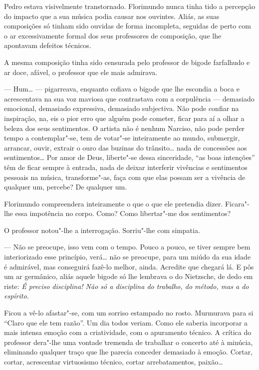 Pedro estava visivelmente transtornado. Florimundo nunca tinha tido a
percepção do impacto que a sua música podia causar nos ouvintes. Aliás,
as suas composições só tinham sido ouvidas de forma incompleta, seguidas
de perto com o ar excessivamente formal dos seus professores de
composição, que lhe apontavam defeitos técnicos.

A mesma composição tinha sido censurada pelo professor de bigode
farfalhudo e ar doce, afável, o professor que ele mais admirava.

--- Hum\ldots{} --- pigarreava, enquanto cofiava o bigode que lhe escondia a boca
e acrescentava na sua voz maviosa que contrastava com a corpulência ---
demasiado emocional, demasiado expressiva, demasiado subjectiva. Não
pode confiar na inspiração, na, eis o pior erro que alguém pode cometer,
ficar para aí a olhar a beleza dos seus sentimentos. O artista não é
nenhum Narciso, não pode perder tempo a contemplar"-se, tem de votar"-se
inteiramente ao mundo, submergir, arrancar, ouvir, extrair o ouro das
buzinas do trânsito\ldots{} nada de concessões aos sentimentos\ldots{} Por amor de
Deus, liberte"-se dessa sinceridade, ``as boas intenções'' têm de ficar
sempre à entrada, nada de deixar interferir vivências e sentimentos
pessoais na música, transforme"-as, faça com que elas possam ser a
vivência de qualquer um, percebe? De qualquer um.

Florimundo compreendera inteiramente o que o que ele pretendia dizer.
Ficara"-lhe essa impotência no corpo. Como? Como libertar"-me dos
sentimentos?

O professor notou"-lhe a interrogação. Sorriu"-lhe com simpatia.

--- Não se preocupe, isso vem com o tempo. Pouco a pouco, se tiver sempre
bem interiorizado esse princípio, verá\ldots{} não se preocupe, para um miúdo
da sua idade é admirável, mas conseguirá fazê-lo melhor, ainda. Acredite
que chegará lá. E pôs um ar germânico, aliás aquele bigode só lhe
lembrava o do Nietzsche, de dedo em riste: \emph{É preciso disciplina! Não só
a disciplina do trabalho, do método, mas a do espírito.}

Ficou a vê-lo afastar"-se, com um sorriso estampado no rosto. Murmurava
para si ``Claro que ele tem razão''. Um dia todos veriam. Como ele saberia
incorporar a mais intensa emoção com a criatividade, com o apuramento
técnico. A crítica do professor dera"-lhe uma vontade tremenda de
trabalhar o concerto até à minúcia, eliminando qualquer traço que lhe
parecia conceder demasiado à emoção. Cortar, cortar, acrescentar
virtuosismo técnico, cortar arrebatamentos, paixão\ldots{}

